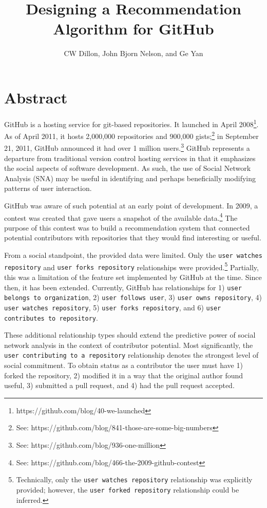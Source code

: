 \documentclass{article}
\title{Designing a Recommendation Algorithm for GitHub}
\author{CW Dillon, John Bjorn Nelson, and Ge Yan}
\begin{document}
  \maketitle
  
  \section*{Abstract}
  
  GitHub is a hosting service for git-based repositories. It launched in April 2008\footnote{https://github.com/blog/40-we-launched}. As of April 2011, it hosts 2,000,000 repositories and 900,000 gists;\footnote{See: https://github.com/blog/841-those-are-some-big-numbers} in September 21, 2011, GitHub announced it had over 1 million users.\footnote{See: https://github.com/blog/936-one-million} GitHub represents a departure from traditional version control hosting services in that it emphasizes the social aspects of software development. As such, the use of Social Network Analysis (SNA) may be useful in identifying and perhaps beneficially modifying patterns of user interaction.
  
  GitHub was aware of such potential at an early point of development. In 2009, a contest was created that gave users a snapshot of the available data.\footnote{See: https://github.com/blog/466-the-2009-github-contest} The purpose of this contest was to build a recommendation system that connected potential contributors with repositories that they would find interesting or useful. 
  
  From a social standpoint, the provided data were limited. Only the {\tt user watches repository} and {\tt user forks repository} relationships were provided.\footnote{Technically, only the {\tt user watches repository} relationship was explicitly provided; however, the {\tt user forked repository} relationship could be inferred.} Partially, this was a limitation of the feature set implemented by GitHub at the time. Since then, it has been extended. Currently, GitHub has relationships for 1) {\tt user belongs to organization}, 2) {\tt user follows user}, 3) {\tt user owns repository}, 4) {\tt user watches repository}, 5) {\tt user forks repository}, and 6) {\tt user contributes to repository}. 
  
  These additional relationship types should extend the predictive power of social network analysis in the context of contributor potential. Most significantly, the {\tt user contributing to a repository} relationship denotes the strongest level of social commitment. To obtain status as a contributor the user must have 1) forked the repository, 2) modified it in a way that the original author found useful, 3) submitted a pull request, and 4) had the pull request accepted. 
  
\end{document}
